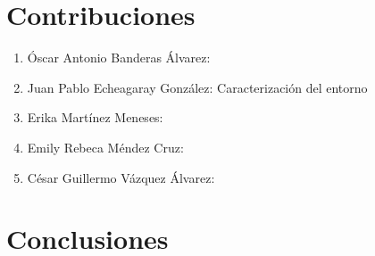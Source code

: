 \documentclass{article}
\begin{document}
    \section{Contribuciones}
        \begin{enumerate}
            \item Óscar Antonio Banderas Álvarez:
            \item Juan Pablo Echeagaray González: Caracterización del entorno
            \item Erika Martínez Meneses:
            \item Emily Rebeca Méndez Cruz:
            \item César Guillermo Vázquez Álvarez:
        \end{enumerate}
    \section{Conclusiones}
    \nocite{*}
    \printbibliography
\end{document}
